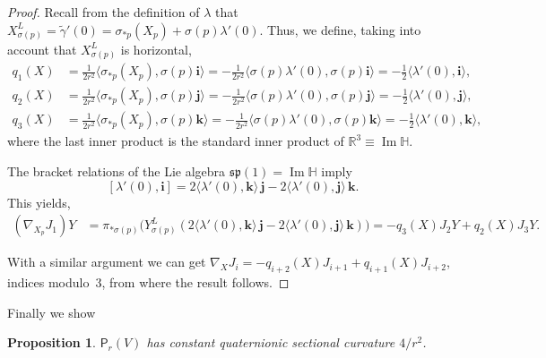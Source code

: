\documentclass[12pt, a4paper]{amsart}
\newcommand{\g}{\mathfrak}
\newcommand{\R}{\mathbb{R}}
\renewcommand{\H}{\mathbb{H}}
\renewcommand{\Im}{\operatorname{Im}}
\newtheorem{proposition}[theorem]{Proposition}
\theoremstyle{remark}
\begin{document}
\begin{proof}
Recall from the definition of $\lambda$ that 
$X_{\sigma(p)}^L=\tilde{\gamma}'(0)=\sigma_{*p}(X_p)+\sigma(p)\lambda'(0)$.
Thus, we define, taking into account that $X_{\sigma(p)}^L$ is horizontal,
\[
\begin{aligned}
q_1(X)&{}=\frac{1}{2r^2}\langle\sigma_{*p}(X_p),\sigma(p)\mathbf{i}\rangle
=-\frac{1}{2r^2}\langle \sigma(p)\lambda'(0),\sigma(p)\mathbf{i}\rangle
=-\frac{1}{2}\langle \lambda'(0),\mathbf{i}\rangle,\\
q_2(X)&{}=\frac{1}{2r^2}\langle\sigma_{*p}(X_p),\sigma(p)\mathbf{j}\rangle
=-\frac{1}{2r^2}\langle \sigma(p)\lambda'(0),\sigma(p)\mathbf{j}\rangle
=-\frac{1}{2}\langle \lambda'(0),\mathbf{j}\rangle,\\
q_3(X)&{}=\frac{1}{2r^2}\langle\sigma_{*p}(X_p),\sigma(p)\mathbf{k}\rangle
=-\frac{1}{2r^2}\langle \sigma(p)\lambda'(0),\sigma(p)\mathbf{k}\rangle
=-\frac{1}{2}\langle \lambda'(0),\mathbf{k}\rangle,
\end{aligned}
\]
where the last inner product is the standard inner product of $\R^3\equiv\Im\H$.

The bracket relations of the Lie algebra $\g{sp}(1)=\Im\H$ imply
\[
[\lambda'(0),\mathbf{i}]
=2\langle\lambda'(0),\mathbf{k}\rangle\,\mathbf{j}-2\langle\lambda'(0),\mathbf{j}\rangle\,\mathbf{k}.
\]
This yields,
\[
\begin{aligned}
(\nabla_{X_p}J_1)Y
&{}=\pi_{*\sigma(p)}\bigl(Y_{\sigma(p)}^L(2\langle\lambda'(0),\mathbf{k}\rangle\,\mathbf{j}-2\langle\lambda'(0),\mathbf{j}\rangle\,\mathbf{k})\bigr)
=-q_3(X)J_2 Y+q_2(X)J_3 Y.
\end{aligned}
\]

With a similar argument we can get $\nabla_X J_i=-q_{i+2}(X)J_{i+1}+q_{i+1}(X)J_{i+2}$, indices modulo~3, from where the result follows.
\end{proof}

Finally we show

\begin{proposition}
$\mathsf{P}_r(V)$ has constant quaternionic sectional curvature $4/r^2$.
\end{proposition}
\end{document}
